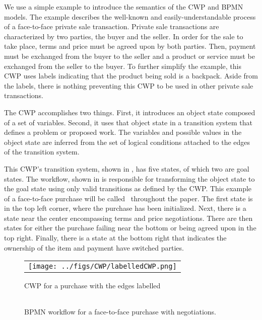 We use a simple example to introduce the semantics of the CWP and BPMN models. The example describes the well-known and easily-understandable process of a face-to-face private sale transaction. Private sale transactions are characterized by two parties, the buyer and the seller. In order for the sale to take place, terms and price must be agreed upon by both parties. Then, payment must be exchanged from the buyer to the seller and a product or service must be exchanged from the seller to the buyer. To further simplify the example, this CWP uses labels indicating that the product being sold is a backpack. Aside from the labels, there is nothing preventing this CWP to be used in other private sale transactions.

The CWP accomplishes two things. First, it introduces an object state composed of a set of variables. Second, it uses that object state in a transition system that defines a problem or proposed work. The variables and possible values in the object state are inferred from the set of logical conditions attached to the edges of the transition system.

This CWP's transition system, shown in , has five states, of which two are goal states. The workflow, shown in  is responsible for transforming the object state to the goal state using only valid transitions as defined by the CWP. This example of a face-to-face purchase will be called \facetoface~throughout the paper. The first state is in the top left corner, where the purchase has been initialized. Next, there is a state near the center encompassing terms and price negotiations. There are then states for either the purchase failing near the bottom or being agreed upon in the top right. Finally, there is a state at the bottom right that indicates the ownership of the item and payment have switched parties.

\begin{figure*}[t]
  \begin{center}
    \begin{tabular}{c}
        \texttt{[image: ../figs/CWP/labelledCWP.png]}
    \end{tabular}
  \end{center}
\caption{CWP for a purchase with the edges labelled}
\label{fig:PurchaseCWP}
\end{figure*}

\begin{figure*}[t]
  \begin{center}
    \begin{tabular}{c}
        
    \end{tabular}
  \end{center}
\caption{BPMN workflow for a face-to-face purchase with negotiations.}
\label{fig:face2face_error_bpmn}
\end{figure*}

